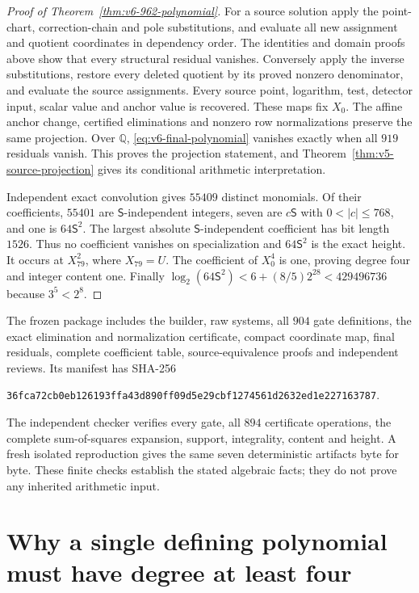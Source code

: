 \documentclass[11pt]{article}
\theoremstyle{definition}
\theoremstyle{remark}
\newcommand{\Q}{\mathbb Q}
\begin{document}
\begin{proof}[Proof of Theorem~\ref{thm:v6-962-polynomial}]
For a source solution apply the point-chart, correction-chain and
pole substitutions, and evaluate all new assignment and quotient
coordinates in dependency order. The identities and domain proofs
above show that every structural residual vanishes. Conversely apply
the inverse substitutions, restore every deleted quotient by its
proved nonzero denominator, and evaluate the source assignments.
Every source point, logarithm, test, detector input, scalar value and
anchor value is recovered. These maps fix $X_0$. The affine anchor
change, certified eliminations and nonzero row normalizations preserve
the same projection. Over $\Q$, \eqref{eq:v6-final-polynomial} vanishes
exactly when all $919$ residuals vanish. This proves the projection
statement, and Theorem~\ref{thm:v5-source-projection} gives its conditional
arithmetic interpretation.

Independent exact convolution gives $55409$ distinct monomials.
Of their coefficients, $55401$ are $\mathsf S$-independent integers,
seven are $c\mathsf S$ with $0<|c|\le768$, and one is
$64\mathsf S^2$. The largest absolute $\mathsf S$-independent coefficient
has bit length $1526$. Thus no coefficient vanishes on specialization
and $64\mathsf S^2$ is the exact height. It occurs at $X_{79}^2$,
where $X_{79}=U$. The coefficient of $X_0^4$ is one, proving degree
four and integer content one. Finally
$\log_2(64\mathsf S^2)<6+(8/5)2^{28}<429496736$ because $3^5<2^8$.
\end{proof}

The frozen package includes the builder, raw systems, all $904$ gate
definitions, the exact elimination and normalization certificate,
compact coordinate map, final residuals, complete coefficient table,
source-equivalence proofs and independent reviews. Its manifest has
SHA-256
\begin{center}\small
\nolinkurl{36fca72cb0eb126193ffa43d890ff09d5e29cbf1274561d2632ed1e227163787}.
\end{center}
The independent checker verifies every gate, all $894$ certificate
operations, the complete sum-of-squares expansion, support,
integrality, content and height. A fresh isolated reproduction gives
the same seven deterministic artifacts byte for byte. These finite
checks establish the stated algebraic facts; they do not prove any
inherited arithmetic input.


\section{Why a single defining polynomial must have degree at least four}
\label{sec:degree-lower-bound}
\end{document}

